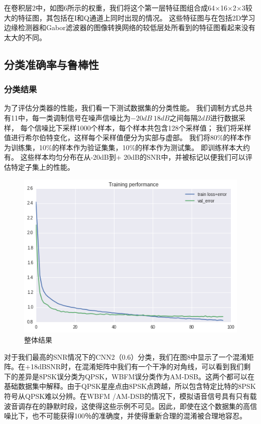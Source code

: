 在卷积层2中，如图6所示的权重，我们将这个第一层特征图组合成64×16×2×3较大的特征图，其包括在I和Q通道上同时出现的情况。 这些特征图与在包括2D学习边缘检测器和Gabor滤波器的图像转换网络的较低层处所看到的特征图看起来没有太大的不同。\par

\subsection{分类准确率与鲁棒性}
\subsubsection*{分类结果}
为了评估分类器的性能，我们看一下测试数据集的分类性能。
我们调制方式总共有11中，每一类调制信号在噪声信噪比为$-20dB~18dB$之间每隔$2dB$进行数据采样，
每个信噪比下采样1000个样本，每个样本共包含128个采样值；
我们将采样值进行希尔伯特变化，这样每个采样值便分为实部与虚部。
我们将80\%的样本作为训练集，10\%的样本作为验证集集，10\%的样本作为测试集。
即训练样本大约有。 这些样本均匀分布在从-20dB到+ 20dB的SNR中，并被标记以便我们可以评估特定子集上的性能。\par
\begin{figure}[!h]
	\centering
	\includegraphics[scale=0.3]{figures/chapter_3/loss}
	\caption{整体结果}	\label{sec:fig_3_9}
\end{figure}
对于我们最高的SNR情况下的CNN2（0.6）分类，我们在图8中显示了一个混淆矩阵。在+18dBSNR时，在混淆矩阵中我们有一个干净的对角线，可以看到我们剩下的差异是8PSK误分类为QPSK，WBFM误分类作为AM-DSB。这两个都可以在基础数据集中解释。由于QPSK星座点由8PSK点跨越，所以包含特定比特的8PSK符号从QPSK难以分辨。在WBFM /AM-DSB的情况下，模拟语音信号具有只有载波音调存在的静默时段，这使得这些示例不可见。因此，即使在这个数据集的高信噪比下，也不可能获得100％的准确度，并使得重新合理的混淆被合理地容忍。\par
